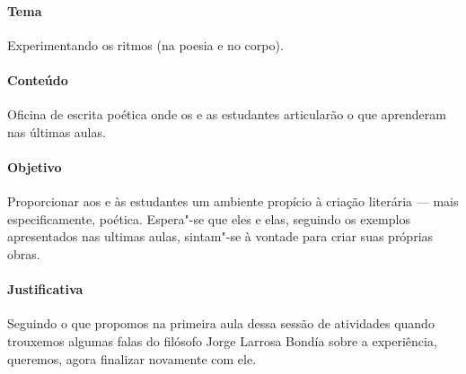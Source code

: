\documentclass[12pt]{extarticle}
\begin{document}



\paragraph{Tema} Experimentando os ritmos (na poesia e no corpo).

\paragraph{Conteúdo} Oficina de escrita poética onde os e as estudantes 
articularão o que aprenderam nas últimas aulas.

\paragraph{Objetivo} Proporcionar aos e às estudantes um ambiente 
propício à criação literária --- mais especificamente, poética. Espera"-se
que eles e elas, seguindo os exemplos apresentados nas ultimas aulas,
sintam"-se à vontade para criar suas próprias obras.

\paragraph{Justificativa} Seguindo o que propomos na primeira aula dessa
sessão de atividades quando trouxemos algumas falas do filósofo Jorge 
Larrosa Bondía sobre a experiência, queremos, agora finalizar novamente
com ele.
\end{document}
